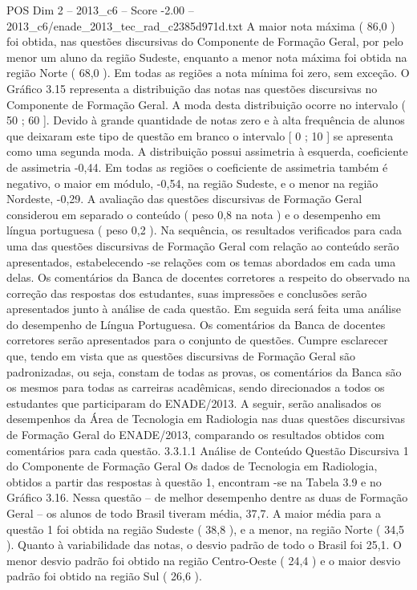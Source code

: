 \begin{textsample}{POS Dim 2 – 2013\_c6 – Score -2.00 – 2013\_c6/enade\_2013\_tec\_rad\_c2385d971d.txt}
A maior nota máxima ( 86,0 ) foi obtida, nas questões discursivas do Componente de Formação Geral, por pelo menor um aluno da região Sudeste, enquanto a menor nota máxima foi obtida na região Norte ( 68,0 ).
Em todas as regiões a nota mínima foi zero, sem exceção.
O Gráfico 3.15 representa a distribuição das notas nas questões discursivas no Componente de Formação Geral.
A moda desta distribuição ocorre no intervalo ( 50 ; 60 ].
Devido à grande quantidade de notas zero e à alta frequência de alunos que deixaram este tipo de questão em branco o intervalo [ 0 ; 10 ] se apresenta como uma segunda moda.
A distribuição possui assimetria à esquerda, coeficiente de assimetria -0,44.
Em todas as regiões o coeficiente de assimetria também é negativo, o maior em módulo, -0,54, na região Sudeste, e o menor na região Nordeste, -0,29.
A avaliação das questões discursivas de Formação Geral considerou em separado o conteúdo ( peso 0,8 na nota ) e o desempenho em língua portuguesa ( peso 0,2 ).
Na sequência, os resultados verificados para cada uma das questões discursivas de Formação Geral com relação ao conteúdo serão apresentados, estabelecendo -se relações com os temas abordados em cada uma delas.
Os comentários da Banca de docentes corretores a respeito do observado na correção das respostas dos estudantes, suas impressões e conclusões serão apresentados junto à análise de cada questão.
Em seguida será feita uma análise do desempenho de Língua Portuguesa.
Os comentários da Banca de docentes corretores serão apresentados para o conjunto de questões.
Cumpre esclarecer que, tendo em vista que as questões discursivas de Formação Geral são padronizadas, ou seja, constam de todas as provas, os comentários da Banca são os mesmos para todas as carreiras acadêmicas, sendo direcionados a todos os estudantes que participaram do ENADE/2013.
A seguir, serão analisados os desempenhos da Área de Tecnologia em Radiologia nas duas questões discursivas de Formação Geral do ENADE/2013, comparando os resultados obtidos com comentários para cada questão. 3.3.1.1 Análise de Conteúdo Questão Discursiva 1 do Componente de Formação Geral Os dados de Tecnologia em Radiologia, obtidos a partir das respostas à questão 1, encontram -se na Tabela 3.9 e no Gráfico 3.16.
Nessa questão – de melhor desempenho dentre as duas de Formação Geral – os alunos de todo Brasil tiveram média, 37,7.
A maior média para a questão 1 foi obtida na região Sudeste ( 38,8 ), e a menor, na região Norte ( 34,5 ).
Quanto à variabilidade das notas, o desvio padrão de todo o Brasil foi 25,1.
O menor desvio padrão foi obtido na região Centro-Oeste ( 24,4 ) e o maior desvio padrão foi obtido na região Sul ( 26,6 ).

\end{textsample}

